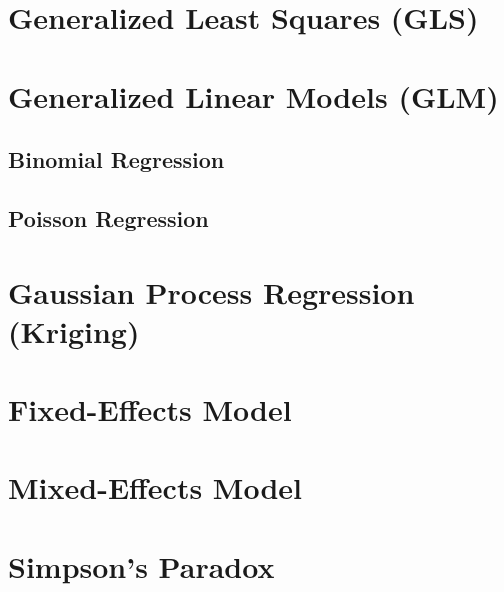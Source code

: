 \section{Generalized Least Squares (GLS)}
\label{regression:GLS}

\section{Generalized Linear Models (GLM)}
\label{regression:GLM}

\subsection{Binomial Regression}
\label{regression:GLM:binomial}

\subsection{Poisson Regression}
\label{regression:GLM:poisson}

\section{Gaussian Process Regression (Kriging)}
\label{regression:kriging}


\section{Fixed-Effects Model}
\label{regression:fixed_effects}

\section{Mixed-Effects Model}
\label{regression:mixed_effects}

\section{Simpson's Paradox}
\label{regression:simpsons_paradox}
